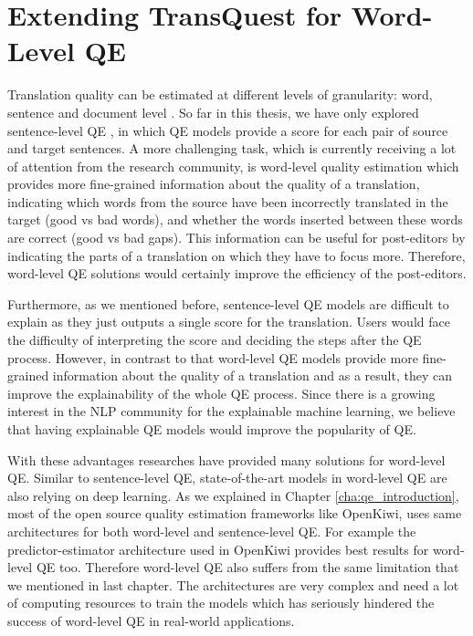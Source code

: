 \chapter{\label{cha:qe_word}Extending TransQuest for Word-Level QE}

Translation quality can be estimated at different levels of granularity: word, sentence and document level \cite{ive-etal-2018-deepquest}. So far in this thesis, we have only explored sentence-level QE \cite{specia-etal-2020-findings-wmt}, in which QE models provide a score for each pair of source and target sentences. A more challenging task, which is currently receiving a lot of attention from the research community, is word-level quality estimation which provides more fine-grained information about the quality of a translation, indicating which words from the source have been incorrectly translated in the target (good vs bad words), and whether the words inserted between these words are correct (good vs bad gaps). This information can be useful for post-editors by indicating the parts of a translation on which they have to focus more. Therefore, word-level QE solutions would certainly improve the efficiency of the post-editors.

Furthermore, as we mentioned before, sentence-level QE models are difficult to explain as they just outputs a single score for the translation. Users would face the difficulty of interpreting the score and deciding the steps after the QE process. However, in contrast to that word-level QE models provide more fine-grained information about the quality of a translation and as a result, they can improve the explainability of the whole QE process. Since there is a growing interest in the NLP community for the explainable machine learning, we believe that having explainable QE models would improve the popularity of QE.   

With these advantages researches have provided many solutions for word-level QE. Similar to sentence-level QE, state-of-the-art models in word-level QE are also relying on deep learning. As we explained in Chapter \ref{cha:qe_introduction}, most of the open source quality estimation frameworks like OpenKiwi, uses same architectures for both word-level and sentence-level QE. For example the predictor-estimator architecture used in OpenKiwi provides best results for word-level QE too. Therefore word-level QE also suffers from the same limitation that we mentioned in last chapter. The architectures are very complex and need a lot of computing resources to train the models which has seriously hindered the success of word-level QE in real-world applications.

